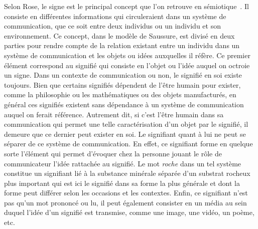 Selon Rose, le signe est le principal concept que l'on retrouve en sémiotique~\citeyearpar[113]{Rose2012}.
Il consiste en différentes informations qui circuleraient dans un système de communication, que ce soit entre deux individus ou un individu et son environnement.
Ce concept, dans le modèle de Saussure, est divisé en deux parties pour rendre compte de la relation existant entre un individu dans un système de communication et les objets ou idées auxquelles il réfère.
Ce premier élément correspond au signifié qui consiste en l'objet ou l'idée auquel on octroie un signe.
Dans un contexte de communication ou non, le signifié en soi existe toujours.
Bien que certains signifiés dépendent de l'être humain pour exister, comme la philosophie ou les mathématiques ou des objets manufacturés, en général ces signifiés existent sans dépendance à un système de communication auquel on ferait référence.
Autrement dit, si c'est l'être humain dans sa communication qui permet une telle caractérisation d'un objet par le signifié, il demeure que ce dernier peut exister en soi.
Le signifiant quant à lui ne peut se séparer de ce système de communication.
En effet, ce signifiant forme en quelque sorte l'élément qui permet d'évoquer chez la personne jouant le rôle de communicateur l'idée rattachée au signifié.
Le mot \emph{roche} dans un tel système constitue un signifiant lié à la substance minérale séparée d'un substrat rocheux plus important qui est ici le signifié dans sa forme la plus générale et dont la forme peut différer selon les occasions et les contextes.
Enfin, ce signifiant n'est pas qu'un mot prononcé ou lu, il peut également consister en un média au sein duquel l'idée d'un signifié est transmise, comme une image, une vidéo, un poème, etc.

